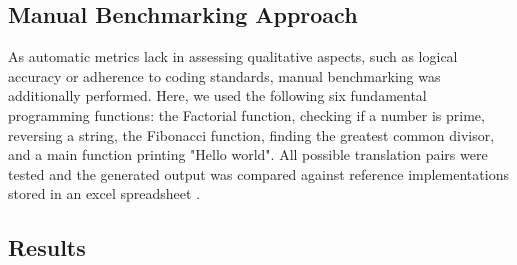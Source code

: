 \documentclass[conference]{IEEEtran}
\begin{document}
\subsection{Manual Benchmarking Approach}
As automatic metrics lack in assessing qualitative aspects, such as logical accuracy or adherence to coding standards, manual benchmarking was additionally performed.
Here, we used the following six fundamental programming functions: the Factorial function, checking if a number is prime, reversing a string, the Fibonacci function, finding the greatest common divisor, and a main function printing "Hello world". All possible translation pairs were tested and the generated output was compared against reference implementations stored in an excel spreadsheet \cite{b1}.
\subsection{Results}\label{res}
\end{document}
